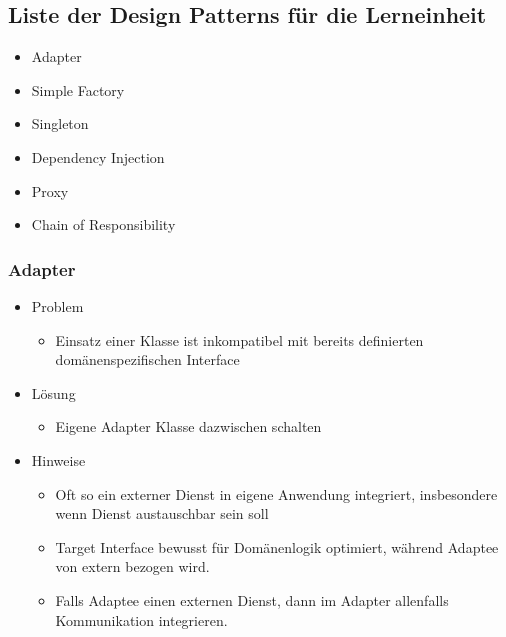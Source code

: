 \documentclass[../ZF_SWEN1.tex]{subfiles}
\begin{document}
\subsection{Liste der Design Patterns für die Lerneinheit}
\begin{itemize}
	\item Adapter
	\item Simple Factory 
	\item Singleton
	\item Dependency Injection
	\item Proxy 
	\item Chain of Responsibility
\end{itemize}

\subsubsection{Adapter}

\begin{itemize}
	\item Problem
	\begin{itemize}
		\item Einsatz einer Klasse ist inkompatibel mit bereits definierten domänenspezifischen Interface
	\end{itemize}
	\item Lösung
	\begin{itemize}
		\item Eigene Adapter Klasse dazwischen schalten
	\end{itemize}
	\item Hinweise
	\begin{itemize}
		\item Oft so ein externer Dienst in eigene Anwendung integriert, insbesondere wenn Dienst austauschbar sein soll
		\item Target Interface bewusst für Domänenlogik optimiert, während Adaptee von extern bezogen wird.
		\item Falls Adaptee einen externen Dienst, dann im Adapter allenfalls Kommunikation integrieren.
	\end{itemize}
\end{itemize}
\end{document}
